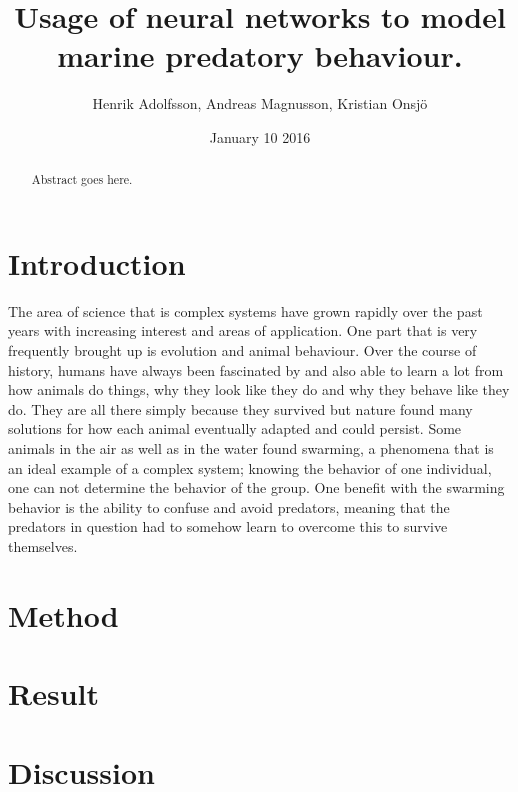 \documentclass[12pt,A4]{article}
\title{Usage of neural networks to model marine predatory behaviour.}
\author{Henrik Adolfsson, Andreas Magnusson, Kristian Onsj\"o}
\date{January 10 2016}
\begin{document}
\parindent=0cm

\maketitle

\begin{abstract}
Abstract goes here.
\end{abstract}

\section{Introduction}
The area of science that is complex systems have grown rapidly over the past years with increasing interest and areas of application. One part that is very frequently brought up is evolution and animal behaviour. Over the course of history, humans have always been fascinated by and also able to learn a lot from how animals do things, why they look like they do and why they behave like they do. They are all there simply because they survived but nature found many solutions for how each animal eventually adapted and could persist. Some animals in the air as well as in the water found swarming, a phenomena that is an ideal example of a complex system; knowing the behavior of one individual, one can not determine the behavior of the group. One benefit with the swarming behavior is the ability to confuse and avoid predators, meaning that the predators in question had to somehow learn to overcome this to survive themselves.

\section{Method}

\section{Result}

\section{Discussion}
\end{document}
